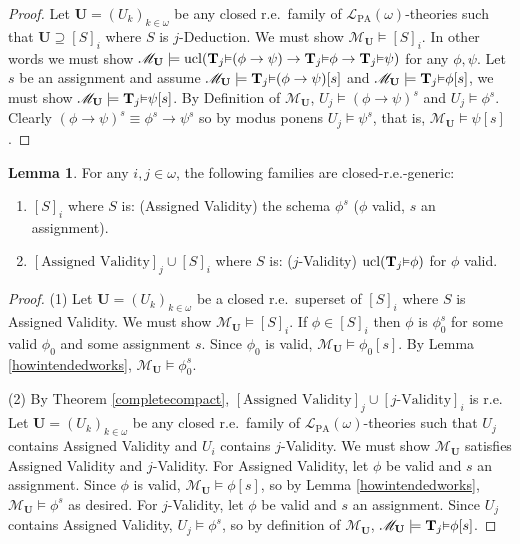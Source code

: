 \documentclass[reqno]{article}
\theoremstyle{definition}
\newtheorem{lemma}[theorem]{Lemma}
\def\L{\mathscr{L}}
\def\M{\mathscr{M}}
\def\T{\mathbf{T}}
\def\U{\mathbf{U}}
\def\LPA{\L_{\mathrm{PA}}}
\renewcommand{\Pr}[1]{\T_{#1}\mbox{\small${\vDash}$}}
\newcommand{\ucl}[1]{\mathrm{ucl}(#1)}
\begin{document}
\begin{proof}
Let $\U=(U_k)_{k\in\omega}$ be any closed r.e.~family of $\LPA(\omega)$-theories
such that $\U\supseteq [S]_i$ where $S$ is $j$-Deduction.  We must show
$\M_{\U}\models [S]_i$.  In other words we must show
$\M_{\U}\models \ucl{\Pr j (\phi\rightarrow\psi)
\rightarrow \Pr j\phi \rightarrow \Pr j \psi}$ for any $\phi,\psi$.
Let $s$ be an assignment and assume $\M_{\U}\models \Pr j (\phi\rightarrow\psi)[s]$
and $\M_{\U}\models \Pr j \phi[s]$, we must show $\M_{\U}\models \Pr j \psi[s]$.
By Definition of $\M_{\U}$, $U_j\models (\phi\rightarrow\psi)^s$ and
$U_j\models \phi^s$.  Clearly $(\phi\rightarrow\psi)^s\equiv
\phi^s\rightarrow\psi^s$ so by modus ponens $U_j\models\psi^s$, that is,
$\M_{\U}\models \psi[s]$.
\end{proof}

\begin{lemma}
\label{firstutilbagvalidity}
For any $i,j\in\omega$, the following families are closed-r.e.-generic:
\begin{enumerate}
    \item
    $[S]_i$ where $S$ is: (Assigned Validity) the schema $\phi^s$ ($\phi$ valid,
    $s$ an assignment).
    \item
    $[\mbox{Assigned Validity}]_j\cup [S]_i$
    where $S$ is: ($j$-Validity) $\ucl{\Pr j \phi}$ for $\phi$ valid.
\end{enumerate}
\end{lemma}

\begin{proof}
\item
(1)
Let $\U=(U_k)_{k\in\omega}$ be a closed r.e.~superset of $[S]_i$ where $S$
is Assigned Validity.  We must show $\M_{\U}\models [S]_i$.
If $\phi\in [S]_i$ then $\phi$ is $\phi^s_0$ for some valid $\phi_0$ and
some assignment $s$.  Since $\phi_0$ is valid, $\M_{\U}\models \phi_0[s]$.
By Lemma \ref{howintendedworks}, $\M_{\U}\models \phi^s_0$.

\item
(2)
By Theorem \ref{completecompact}, $[\mbox{Assigned Validity}]_j\cup[\mbox{$j$-Validity}]_i$
is r.e.
Let $\U=(U_k)_{k\in \omega}$ be any closed r.e.~family
of $\LPA(\omega)$-theories such that $U_j$ contains Assigned Validity
and $U_i$ contains $j$-Validity.
We must show $\M_{\U}$ satisfies Assigned Validity and $j$-Validity.
For Assigned Validity, let $\phi$ be valid and $s$ an assignment.
Since $\phi$ is valid, $\M_{\U}\models\phi[s]$, so by Lemma \ref{howintendedworks},
$\M_{\U}\models\phi^s$ as desired.  For $j$-Validity,
let $\phi$ be valid and $s$ an assignment.
Since $U_j$ contains Assigned Validity, $U_j\models\phi^s$, so
by definition of $\M_{\U}$, $\M_{\U}\models \Pr j\phi[s]$.
\end{proof}
\end{document}
